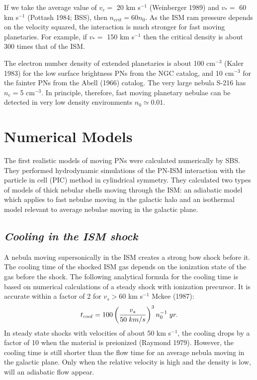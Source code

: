 \noindent
If we take the average value of $v_{e}=$ 20 km s$^{-1}$ (Weinberger 1989)
and $v_*= $ 60 km s$^{-1}$ (Pottash 1984; BSS), then $n_{crit}=60 n_0$.
As the ISM ram pressure depends on the velocity squared,
the interaction is much stronger for fast moving planetaries.
For example, if $v_*=$ 150 km s$^{-1}$ then the critical
density is about $300$ times that of the ISM.

\noindent
The electron number density of extended planetaries is about 100 cm$^{-3}$
(Kaler 1983) for the low surface brightness PNs from the NGC catalog,
and 10 cm$^{-3}$ for the fainter PNs from the Abell (1966) catalog.
The very large nebula S-216 has $n_e=$5 cm$^{-3}$.
In principle, therefore, fast moving planetary nebulae can be detected in
very low density environments $n_{0}\simeq 0.01$.

\section{Numerical Models}
\noindent
The first realistic models of moving PNs were calculated numerically by
SBS. They performed hydrodynamic simulations of the PN-ISM interaction
with the particle in cell (PIC) method in cylindrical symmetry. They
calculated two types of models of thick nebular shells moving through the ISM:
an adiabatic model which applies to fast nebulae moving in the
galactic halo and an isothermal model relevant to average nebulae
moving in the galactic plane.
\noindent

\subsection{\it Cooling in the ISM shock}
A nebula moving supersonically in the ISM creates a strong bow
shock before it. The cooling time of the shocked
ISM gas depends on the ionization state of the gas before
the shock. The following analytical formula for the cooling
time is based on numerical calculations of a steady shock
with ionization precursor. It is accurate within a factor
of 2 for $v_s>$60 km s$^{-1}$ Mckee (1987):
\begin{eqnarray}
t_{cool}=100 \left({v_s\over 50\; km/s}\right)^3 n_{0}^{-1}\; yr.
\end{eqnarray}
In steady state shocks with velocities of about 50 km s$^{-1}$,
the cooling drops by a factor of 10 when the material is preionized
(Raymond 1979). However, the cooling time is still shorter
than the flow time for an average nebula moving in the galactic plane.
Only when the relative velocity is high and the density is low,
will an adiabatic flow appear.

